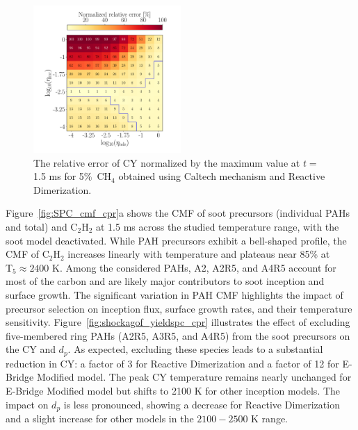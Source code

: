 \begin{figure}[H]
	\centering
	\includegraphics[width=0.5\textwidth]{Figures/Results/Shocktube/Agafonov2016_cpr/5CH4_norm_yield_error_readim.pdf}
	\caption{The relative error of CY normalized by the maximum value at $t=$1.5 ms for 5\%~$\mathrm{CH_4}$ obtained using Caltech mechanism and Reactive Dimerization.}
	\label{fig:shockagof_yielderror_cpr} 
\end{figure}



Figure~\ref{fig:SPC_cmf_cpr}a shows the CMF of soot precursors (individual PAHs and total) and $\mathrm{C_2H_2}$ at 1.5 ms across the studied temperature range, with the soot model deactivated. While PAH precursors exhibit a bell-shaped profile, the CMF of $\mathrm{C_2H_2}$ increases linearly with temperature and plateaus near 85\% at $\mathrm{T_5} \approx 2400$ K. Among the considered PAHs, A2, A2R5, and A4R5 account for most of the carbon and are likely major contributors to soot inception and surface growth. The significant variation in PAH CMF highlights the impact of precursor selection on inception flux, surface growth rates, and their temperature sensitivity. Figure~\ref{fig:shockagof_yieldspc_cpr} illustrates the effect of excluding five-membered ring PAHs (A2R5, A3R5, and A4R5) from the soot precursors on the CY and $d_p$. As expected, excluding these species leads to a substantial reduction in CY: a factor of 3 for Reactive Dimerization and a factor of 12 for E-Bridge Modified model. The peak CY temperature remains nearly unchanged for E-Bridge Modified model but shifts to 2100 K for other inception models. The impact on $d_p$ is less pronounced, showing a decrease for Reactive Dimerization and a slight increase for other models in the $2100-2500$ K range.

